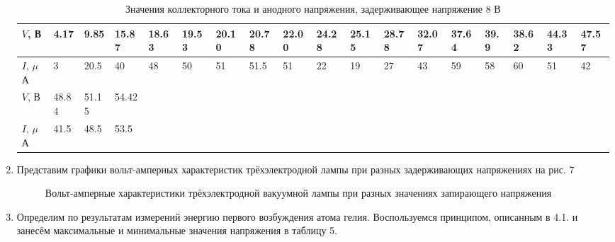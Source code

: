 \documentclass[a4paper]{article}
\begin{document}
\begin{enumerate}
\begin{table}[h]
\begin{tabular}{ |p{1cm}||p{0.6cm}|p{0.6cm}|p{0.6cm}|p{0.6cm}|p{0.6cm}|p{0.6cm}|p{0.6cm}|p{0.6cm}|p{0.6cm}|p{0.6cm}|p{0.6cm}|p{0.6cm}|p{0.6cm}|p{0.6cm}|p{0.6cm}|p{0.6cm}|p{0.6cm}|}
\hline
 
\end{tabular}
\end{table}

    \begin{table}[h]
    \centering
    \begin{center}
    \caption{Значения коллекторного тока и анодного напряжения, задерживающее напряжение 8 В}
    \end{center}
    \vspace{0.1cm}
    \label{tab:my_label}
    \begin{tabular}{ |p{1cm}||p{0.6cm}|p{0.6cm}|p{0.6cm}|p{0.6cm}|p{0.6cm}|p{0.6cm}|p{0.6cm}|p{0.6cm}|p{0.6cm}|p{0.6cm}|p{0.6cm}|p{0.6cm}|p{0.6cm}|p{0.6cm}|p{0.6cm}|p{0.6cm}|p{0.6cm}|}
 \hline
$V$, В & 4.17 & 9.85 & 15.87 & 18.63 & 19.53 & 20.10 & 20.78 & 22.00 & 24.28 & 25.15 & 28.78 & 32.07 & 37.64 & 39.9 & 38.62 & 44.33 & 47.57\\
 \hline
 $I$, $\mu$А & 3 & 20.5 & 40 & 48 & 50 & 51 & 51.5 & 51 & 22 & 19 & 27 & 43 & 59 & 58 & 60 & 51 & 42\\
\hline
\hline
$V$, В & 48.84 & 51.15 & 54.42 & & &  &  &  &  &  &  &  &  &  &  &  & \\
\hline
$I$, $\mu$А & 41.5 & 48.5 & 53.5 & & &  &  & &  &  &  &  &  &  &  &  & \\
\hline
 
\end{tabular}
\end{table}

\item Представим графики вольт-амперных характеристик трёхэлектродной лампы при разных задерживающих напряжениях на рис. 7


\begin{figure}[h!]
    \centering
    \begin{floatrow}
        
        \caption{Вольт-амперные характеристики трёхэлектродной вакуумной лампы при разных значениях запирающего напряжения}
    \end{floatrow}
\end{figure}

\item Определим по результатам измерений энергию первого возбуждения атома гелия. Воспользуемся принципом, описанным в 4.1. и занесём максимальные и минимальные значения напряжения в таблицу 5.


\end{enumerate}
\end{document}
